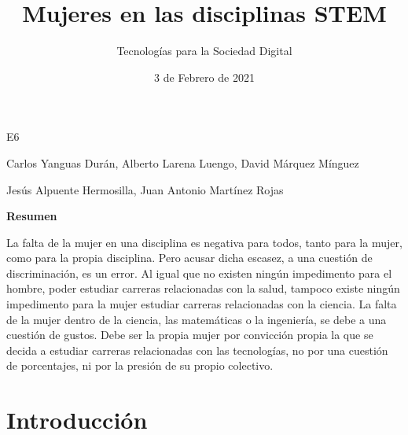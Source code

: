  

 

\graphicspath{{../Book/figures/}}

\title{Mujeres en las disciplinas STEM}
\date{3 de Febrero de 2021}            
\author{Tecnologías para la Sociedad Digital}




\maketitle
\begin{description}                               
  {        
  \item[Título en inglés:] \mybooktitleenglish   
  }                                            
  {                                           
  }                                              
\item[Equipo:] E6 
\item[Autores:] Carlos Yanguas Durán, Alberto Larena Luengo, David Márquez Mínguez                 
\item[\expandafter\makefirstuc\expandafter{\mybookTutorOrTutores}:] Jesús Alpuente Hermosilla, Juan Antonio Martínez Rojas      
\end{description}      
\setcounter{page}{1}


\begin{center}
 {\bfseries \Large Resumen}
\end{center}
La falta de la mujer en una disciplina es negativa para todos, tanto para la mujer, como para la propia disciplina. 
Pero acusar dicha escasez, a una cuestión de discriminación, es un error. Al igual que no existen ningún impedimento 
para el hombre, poder estudiar carreras relacionadas con la salud, tampoco existe ningún impedimento para la mujer
 estudiar carreras relacionadas con la ciencia. La falta de la mujer dentro de la ciencia, las matemáticas o la ingeniería,
 se debe a una cuestión de gustos. Debe ser la propia mujer por convicción propia la que se decida a estudiar carreras
 relacionadas con las tecnologías, no por una cuestión de porcentajes, ni por la presión de su propio colectivo.               

\section{Introducción}
\label{sec:introduccion}

